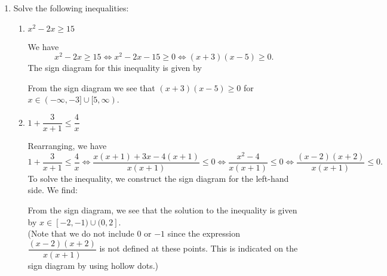 \documentclass[12pt]{article}
\begin{document}
\thispagestyle{fancy}

 \begin{enumerate}
 \item  Solve the following inequalities:
\begin{enumerate}
 \item $x^2-2x\geq 15$

\bigskip

We have
\[
 x^2-2x\geq 15\Leftrightarrow x^2-2x-15\geq 0 \Leftrightarrow (x+3)(x-5)\geq 0.
\]
The sign diagram for this inequality is given by
\begin{center}
\end{center}

From the sign diagram we see that $(x+3)(x-5)\geq 0$ for $x\in (-\infty,-3]\cup[5,\infty)$.

 \item $1+\dfrac{3}{x+1}\leq\dfrac{4}{x}$

\bigskip

Rearranging, we have
\[
 1+\dfrac{3}{x+1}\leq\dfrac{4}{x} \Leftrightarrow \frac{x(x+1)+3x-4(x+1)}{x(x+1)}\leq 0 \Leftrightarrow \frac{x^2-4}{x(x+1)}\leq 0 \Leftrightarrow \frac{(x-2)(x+2)}{x(x+1)}\leq 0.
\]
To solve the inequality, we construct the sign diagram for the left-hand side. We find:
\begin{center}
\end{center}
From the sign diagram, we see that the solution to the inequality is given by $x\in [-2,-1)\cup(0,2]$. \\
(Note that we do not include $0$ or $-1$ since the expression $\dfrac{(x-2)(x+2)}{x(x+1)}$ is not defined at these points. This is indicated on the sign diagram by using hollow dots.)
\end{enumerate}


\end{enumerate}
\end{document}
